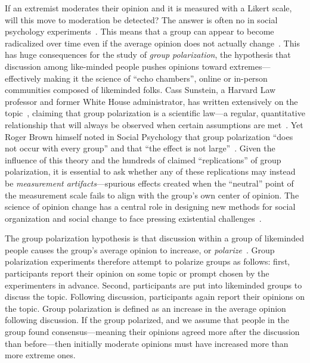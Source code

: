 \documentclass[preview]{article}
\begin{document}
If an extremist moderates their opinion and it is measured with a Likert scale, will
this move to moderation be detected? The answer is often no in social psychology 
experiments~\cite{Liddell2018}. This
means that a group can appear to become radicalized over time even if the 
average opinion does not actually change~\cite{Turner2020}. 
This has huge consequences for the study of \emph{group polarization}, the hypothesis
that discussion among like-minded people pushes opinions toward extremes—effectively 
making it the science of ``echo chambers'', online or in-person communities 
composed of likeminded folks.  Cass Sunstein, a
Harvard Law professor and former White House administrator, has written
extensively on the topic~\cite{Sunstein2019}, claiming that group
polarization is a scientific law—a regular, quantitative relationship that
will always be observed when certain assumptions are
met~\cite{Cartwright1999}. Yet Roger Brown himself noted in Social Psychology
that group polarization ``does not occur with every group'' and that ``the
effect is not large''~\cite{Brown1986}. 
Given the influence of this theory and the hundreds of claimed ``replications'' of
group polarization, it is essential to ask whether any of these replications may
instead be \emph{measurement artifacts}—spurious effects created when the
``neutral'' point of the measurement scale fails to align with the group’s own
center of opinion. The science of opinion change has a central role in designing new
methods for social organization and social change to face pressing existential
challenges~\cite{Galesic2021,GalesicEtAl2023}.

The group polarization hypothesis is that discussion within a group of
likeminded people causes the group's average opinion to increase, or
\emph{polarize}~\cite{Brown1986,Brown2000}.
Group polarization experiments therefore attempt to
polarize groups as follows: first, participants report their opinion on
some topic or prompt chosen by the experimenters in advance. Second, 
participants are put into likeminded groups to
discuss the topic. Following discussion, participants again report their
opinions on the topic. Group polarization is defined as an increase in
the average opinion following discussion. If the group polarized, and we 
assume that people in the group found consensus—meaning their opinions agreed
more after the discussion than before—then initially moderate opinions must have
increased more than more extreme ones.
\end{document}

